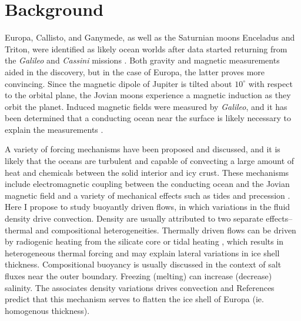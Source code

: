 \documentclass{article}
\begin{document}
\section{Background}
Europa, Callisto, and Ganymede, as well as the Saturnian moons Enceladus and Triton, were identified as likely ocean worlds after data started returning from the \textit{Galileo} and \textit{Cassini} missions \citep{fN16}.
Both gravity and magnetic measurements aided in the discovery, but in the case of Europa, the latter proves more convincing. 
Since the magnetic dipole of Jupiter is tilted about $10^{\circ}$ with respect to the orbital plane, the Jovian moons experience a magnetic induction as they orbit the planet.
Induced magnetic fields were measured by \textit{Galileo}, and it has been determined that a conducting ocean near the surface is likely necessary to explain the measurements \citep{fN16,cZ00}. 

A variety of forcing mechanisms have been proposed and discussed, and it is likely that the oceans are turbulent and capable of convecting a large amount of heat and chemicals between the solid interior and icy crust.
These mechanisms include electromagnetic coupling between the conducting ocean and the Jovian magnetic field \citep{cGlP19} and a variety of mechanical effects such as tides and precession \citep{kS24}. 
Here I propose to study buoyantly driven flows, in which variations in the fluid density drive convection.
Density are usually attributed to two separate effects-- thermal and compositional heterogeneities.
Thermally driven flows can be driven by radiogenic heating from the silicate core \citep{kS14,kS19,jK22} or tidal heating \citep{gT03,dL23}, which results in heterogeneous thermal forcing and may explain lateral variations in ice shell thickness. 
Compositional buoyancy is usually discussed in the context of salt fluxes near the outer boundary. 
Freezing (melting) can increase (decrease) salinity. The associates density variations drives convection and References \citep{yA21,wK22} predict that this mechanism serves to flatten the ice shell of Europa (ie.  homogenous thickness). 
\end{document}
